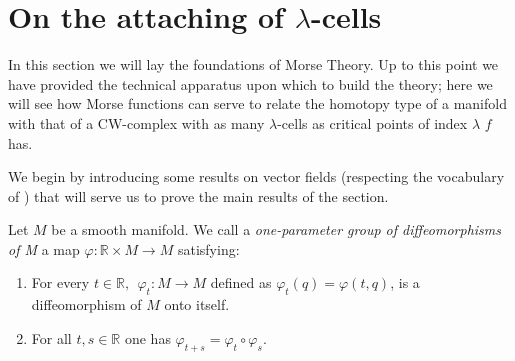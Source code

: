 

\section{On the attaching of $\lambda$-cells}

In this section we will lay the foundations of Morse Theory. Up to this point we have provided the technical apparatus upon which to build the theory; here we will see how Morse functions can serve to relate the homotopy type of a manifold with that of a CW-complex with as many $\lambda$-cells as critical points of index $\lambda$ $f$ has.

\medskip

We begin by introducing some results on vector fields (respecting the vocabulary of \cite{milnor1963}) that will serve us to prove the main results of the section.

\begin{definition}
    Let $M$ be a smooth manifold. We call a \textit{one-parameter group of diffeomorphisms of M} a map $\varphi:\mathbb{R}\times M \to M$ satisfying:
    \begin{enumerate}[label=\roman*)]
        \item For every $t\in \mathbb{R},~~ \varphi_t:M\to M$ defined as $\varphi_t(q)=\varphi(t,q)$, is a diffeomorphism of $M$ onto itself.

        \item For all $t, s\in\mathbb{R}$ one has $\varphi_{t+s}=\varphi_t\circ \varphi_s$.
    \end{enumerate}
\end{definition}

